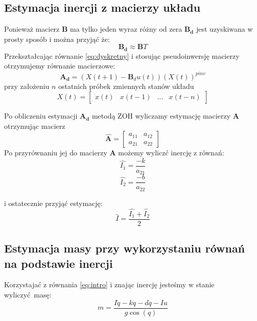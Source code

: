 \documentclass[a4paper, 10pt]{article}
\begin{document}
\subsection{Estymacja inercji z macierzy układu}
\label{sec:pos}
Ponieważ macierz $\mathbf{B}$ ma tylko jeden wyraz różny od zera $\mathbf{B_d}$ jest uzyskiwana w prosty sposób i można przyjąć że:
\begin{equation}
\mathbf{B_d} \approx \mathbf{B}T
\end{equation}
Przekształcając równanie \ref{eq:dyskretny} i stosując pseudoinwersję macierzy otrzymujemy równanie macierzowe:
\begin{equation}
\mathbf{A_d} = (X(t+1) - \mathbf{B}_du(t))(X(t))^{pinv}
\label{eq:pinv}
\end{equation}
przy założeniu $n$ ostatnich próbek zmiennych stanów układu
\begin{equation}
X(t) = 	\begin{bmatrix}
x(t) & x(t-1)  & ... & x(t-n)
\end{bmatrix}
\label{eq:xk}
\end{equation}

Po obliczeniu estymacji $\mathbf{A_d}$ metodą ZOH wyliczamy estymację macierzy $\mathbf{A}$ otrzymując macierz
\begin{equation}
\mathbf{\hat{A}} = 	\begin{bmatrix}
a_{11} & a_{12}\\
a_{21} & a_{22}
\end{bmatrix}
\end{equation}
Po przyrównaniu jej do macierzy $\mathbf{A}$ możemy wyliczć inercję z równań:
\begin{equation}
\hat{I_1} = \frac{-k}{a_{21}}
\end{equation}
\begin{equation}
\hat{I_2} = \frac{-b}{a_{22}}
\end{equation}

i ostatecznie przyjąć estymację:
\begin{equation}
\hat{I} = \frac{\hat{I_1}+\hat{I_2}}{2}
\end{equation}

\subsection{Estymacja masy przy wykorzystaniu równań na podstawie inercji}
Korzystajać z równania \ref{eq:intro} i znając inercję jesteśmy w stanie wyliczyć masę:
\begin{equation}
m = \frac{I\ddot{q} - kq - d\dot{q} -Iu}{g\cos{(q)}}
\end{equation}
\end{document}
